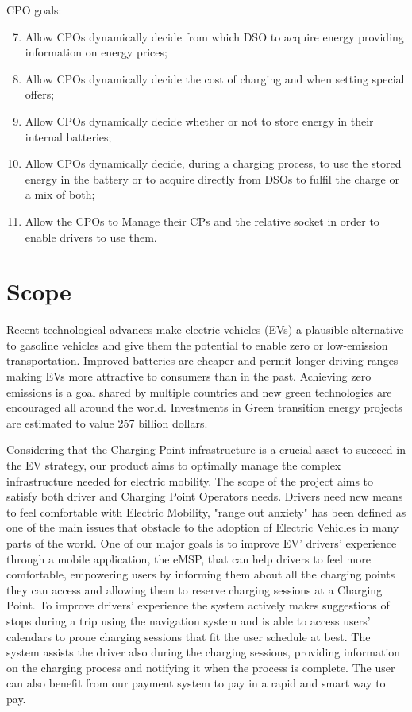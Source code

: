 \documentclass{Configuration_Files/PoliMi3i_thesis}
\begin{document}
CPO goals:
\begin{enumerate}[label=\textbf{G\arabic*}]\setcounter{enumi}{6}

    \item Allow CPOs dynamically decide from which DSO to acquire energy providing information on energy prices;

    \item Allow CPOs dynamically decide the cost of charging and when setting special offers;

    \item Allow CPOs dynamically decide whether or not to store energy in their internal batteries;

    \item Allow CPOs dynamically decide, during a charging process, to use the stored energy in the battery or to acquire directly from DSOs to fulfil the charge or a mix of both;

    \item Allow the CPOs to Manage their CPs and the relative socket in order to enable drivers to use them.

\end{enumerate}

\section{Scope}
Recent technological advances make electric vehicles (EVs) a plausible alternative to gasoline vehicles and give them the potential to enable zero or low-emission transportation. Improved batteries are cheaper and permit longer driving ranges making EVs more attractive to consumers than in the past.
Achieving zero emissions is a goal shared by multiple countries and new green technologies are encouraged all around the world. Investments in  Green transition energy projects are estimated to value 257 billion dollars. 

Considering that the Charging Point infrastructure is a crucial asset to succeed in the EV strategy, our product aims to optimally manage the complex infrastructure needed for electric mobility. 
The scope of the project aims to satisfy both driver  and Charging Point Operators needs.
Drivers need new means to feel comfortable with Electric Mobility, "range out anxiety" has been defined as one of the main issues that obstacle to the adoption of Electric Vehicles in many parts of the world.
One of our major goals is to improve EV' drivers' experience through a mobile application, the eMSP, that can help drivers to feel more comfortable, empowering users by informing them about all the charging points they can access and allowing them to reserve charging sessions at a Charging Point. To improve drivers' experience the system actively makes suggestions of stops during a trip using the navigation system and is able to access users' calendars to prone charging sessions that fit the user schedule at best.
The system assists the driver also during the charging sessions, providing information on the charging process and notifying it when the process is complete. The user can also benefit from our payment system to pay in a rapid and smart way to pay.
\end{document}
